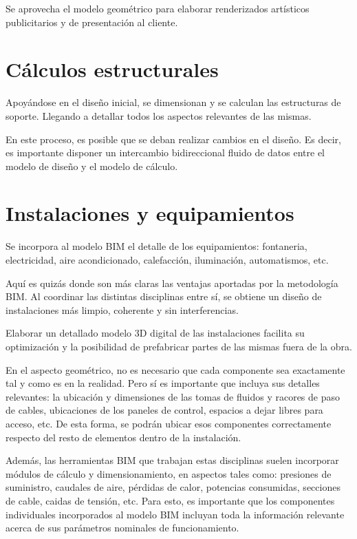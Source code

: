 \documentclass[spanish,12pt,a4paper,final,oneside]{book}
\begin{document}
Se aprovecha el modelo geométrico para elaborar renderizados artísticos publicitarios y de presentación al cliente.

\section{Cálculos estructurales}
Apoyándose en el diseño inicial, se dimensionan y se calculan las estructuras de soporte. Llegando a detallar todos los aspectos relevantes de las mismas.

En este proceso, es posible que se deban realizar cambios en el diseño. Es decir, es importante disponer un intercambio bidireccional fluido de datos entre el modelo de diseño y el modelo de cálculo.

\section{Instalaciones y equipamientos}
Se incorpora al modelo BIM el detalle de los equipamientos: fontaneria, electricidad, aire acondicionado, calefacción, iluminación, automatismos, etc.

Aquí es quizás donde son más claras las ventajas aportadas por la metodología BIM. Al coordinar las distintas disciplinas entre sí, se obtiene un diseño de instalaciones más limpio, coherente y sin interferencias.

Elaborar un detallado modelo 3D digital de las instalaciones facilita su optimización y la posibilidad de prefabricar partes de las mismas fuera de la obra.

En el aspecto geométrico, no es necesario que cada componente sea exactamente tal y como es en la realidad. Pero sí es importante que incluya sus detalles relevantes: la ubicación y dimensiones de las tomas de fluidos y racores de paso de cables, ubicaciones de los paneles de control, espacios a dejar libres para acceso, etc. De esta forma, se podrán ubicar esos componentes correctamente respecto del resto de elementos dentro de la instalación.

Además, las herramientas BIM que trabajan estas disciplinas suelen incorporar módulos de cálculo y dimensionamiento, en aspectos tales como: presiones de suministro, caudales de aire, pérdidas de calor, potencias consumidas, secciones de cable, caidas de tensión, etc. Para esto, es importante que los componentes individuales incorporados al modelo BIM incluyan toda la información relevante acerca de sus parámetros nominales de funcionamiento.
\end{document}
